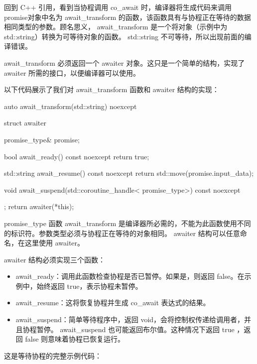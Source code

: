 回到 C++ 引用，看到当协程调用 co\_await 时，编译器将生成代码来调用promise对象中名为 await\_transform 的函数，该函数具有与协程正在等待的数据相同类型的参数。顾名思义， await\_transform 是一个将对象（示例中为 std::string）转换为可等待对象的函数。 std::string 不可等待，所以出现前面的编译错误。

await\_transform 必须返回一个 awaiter 对象。这只是一个简单的结构，实现了 awaiter 所需的接口，以便编译器可以使用。

以下代码展示了我们对 await\_transform 函数和 awaiter 结构的实现：

\begin{cpp}
auto await_transform(std::string) noexcept {
    struct awaiter {
        promise_type& promise;

        bool await_ready() const noexcept {
            return true;
        }

        std::string await_resume() const noexcept {
            return std::move(promise.input_data);
        }

        void await_suspend(std::coroutine_handle<
                           promise_type>) const noexcept {
        }
    };
    return awaiter(*this);
}
\end{cpp}

promise\_type 函数 await\_transform 是编译器所必需的，不能为此函数使用不同的标识符。参数类型必须与协程正在等待的对象相同。 awaiter 结构可以任意命名，在这里使用 awaiter。

awaiter 结构必须实现三个函数：

\begin{itemize}
\item
await\_ready：调用此函数检查协程是否已暂停。如果是，则返回 false。在示例中，始终返回 true，表示协程未暂停。

\item
await\_resume：这将恢复协程并生成 co\_await 表达式的结果。

\item
await\_suspend：简单等待程序中，返回 void，会将控制权传递给调用者，并且协程暂停。 await\_suspend 也可能返回布尔值。这种情况下返回 true ，返回 false 则意味着协程已恢复运行。
\end{itemize}

这是等待协程的完整示例代码：

